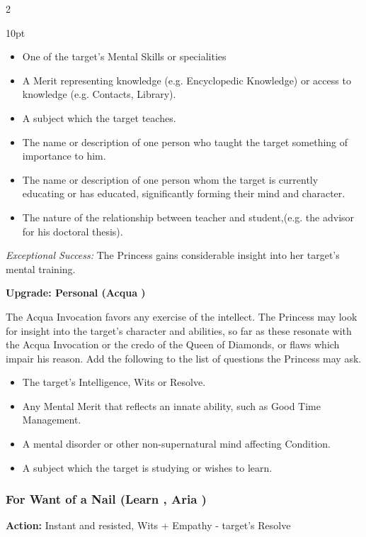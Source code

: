 \begin{multicols}{2}
\begin{myindentpar}{10pt}
\begin{itemize}
 \item One of the target's Mental Skills or specialities
 \item A Merit representing knowledge (e.g. Encyclopedic Knowledge) or access to knowledge (e.g. Contacts, Library).
 \item A subject which the target teaches. 
 \item The name or description of one person who taught the target something of importance to him. 
 \item The name or description of one person whom the target is currently educating or has educated, significantly forming their mind and character.
 \item The nature of the relationship between teacher and student,(e.g. the advisor for his doctoral thesis).
\end{itemize}

\emph{Exceptional Success:} The Princess gains considerable insight into her target's mental training.

\textbf{Upgrade: Personal (Acqua \textbullet\textbullet)}

The Acqua Invocation favors any exercise of the intellect. The Princess may look for insight into the target's character and abilities, so far as these resonate with the Acqua Invocation or the credo of the Queen of Diamonds, or flaws which impair his reason. Add the following to the list of questions the Princess may ask.\end{myindentpar}

\begin{itemize}
\item The target's Intelligence, Wits or Resolve.
\item Any Mental Merit that reflects an innate ability, such as Good Time Management.
\item A mental disorder or other non-supernatural mind affecting Condition. 
\item A subject which the target is studying or wishes to learn. 
\end{itemize}


\subsubsection*{For Want of a Nail (Learn \textbullet\textbullet, Aria \textbullet)}

\noindent \textbf{Action:} Instant and resisted, Wits + Empathy - target's Resolve


\end{multicols}
